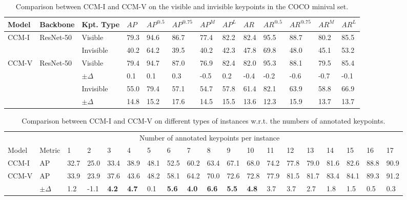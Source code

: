 \documentclass[twocolumn]{svjour3}          \smartqed  \usepackage{natbib}
\begin{document}
\begin{table*}[htbp]
  \centering
  \small
  \caption{Comparison between CCM-I and CCM-V on the visible and invisible keypoints in the COCO minival set.}
    \begin{tabular}{lllllllllllll}
    \toprule
      Model  & Backbone  &   Kpt. Type    & $AP$    & $AP^{@.5}$  & $AP^{@.75}$ & $AP^M$ & $AP^L$ & $AR$  & $AR^{@.5}$  & $AR^{@.75}$ & $AR^M$ & $AR^L$ \\
    \midrule
    \multirow{2}[0]{*}{CCM-I} & \multirow{2}[0]{*}{ResNet-50} & Visible   & 79.3  & 94.6  & 86.7  & 77.4  & 82.2  & 82.4  & 95.5  & 88.7  & 80.2  & 85.5 \\
        \cmidrule{3-13}
        &  & Invisible & 40.2  & 64.2  & 39.5  & 40.2  & 42.3  & 47.8  & 69.8  & 48.0    & 45.1  & 53.2 \\
    \midrule
    \midrule
    \multirow{4}[0]{*}{CCM-V} & \multirow{4}[0]{*}{ResNet-50}& Visible   & 79.4  & 94.7  & 87.0    & 76.9  & 82.4  & 82.0    & 95.3  & 88.1  & 79.5  & 85.4 \\
         & & $\pm \Delta$  & 0.1   & 0.1   & 0.3   & -0.5  & 0.2   & -0.4  & -0.2  & -0.6  & -0.7  & -0.1 \\
          \cmidrule{3-13}
        &  & Invisible & 55.0    & 79.4  & 57.1  & 54.7  & 57.8  & 61.4  & 82.1  & 63.9  & 58.8  & 66.9 \\
         & & $\pm \Delta$  & 14.8  & 15.2  & 17.6  & 14.5  & 15.5  & 13.6  & 12.3  & 15.9  & 13.7  & 13.7 \\
    \bottomrule
    \end{tabular}\label{tab:vis_invis}\end{table*}

\begin{table*}[htbp]
  \centering
  \small
  \caption{Comparison between CCM-I and CCM-V on different types of instances w.r.t. the numbers of annotated keypoints.}
\begin{tabular}{p{1cm}p{0.6cm}p{0.4cm}p{0.6cm}p{0.4cm}p{0.4cm}p{0.4cm}p{0.4cm}p{0.4cm}p{0.4cm}p{0.4cm}p{0.4cm}p{0.4cm}p{0.4cm}p{0.4cm}p{0.4cm}p{0.4cm}p{0.4cm}p{0.4cm}}
    \toprule
    & \multicolumn{17}{c}{Number of annotated keypoints per instance} &\\
    \cmidrule{3-19}
      Model  & Metric & 1     & 2     & 3     & 4     & 5     & 6     & 7     & 8     & 9     & 10    & 11    & 12    & 13    & 14    & 15    & 16    & 17 \\
    \midrule
    CCM-I & AP & 32.7  & 25.0    & 33.4  & 38.9  & 48.1  & 52.5  & 60.2  & 63.4  & 67.1  & 68.0    & 74.2  & 77.8  & 79.0    & 81.6  & 82.6  & 88.8  & 90.9 \\
    \midrule
    \midrule
    \multirow{2}[0]{*}{CCM-V} & AP& 33.9  & 23.9  & 37.6  & 43.6  & 48.2  & 58.1  & 64.2  & 70.0    & 72.6  & 72.8  & 77.9  & 81.5  & 81.7  & 83.4  & 84.1  & 89.3  & 91.2 \\
          &$\pm \Delta$ & 1.2   & -1.1  & \textbf{4.2} & \textbf{4.7} & 0.1   & \textbf{5.6} & \textbf{4.0} & \textbf{6.6} & \textbf{5.5} & \textbf{4.8} & 3.7   & 3.7   & 2.7   & 1.8   & 1.5   & 0.5   & 0.3 \\
    \bottomrule
    \end{tabular}\label{tab:ap_kptsNum}\end{table*}
\end{document}

